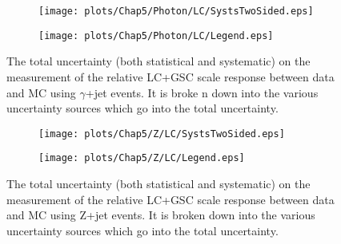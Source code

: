 \begin{figure}[!ht]
\captionsetup[subfigure]{labelformat=empty}
 \begin{center}
   \begin{subfigure}{0.55\textwidth}
     \hspace{-3cm}
     \texttt{[image: plots/Chap5/Photon/LC/SystsTwoSided.eps]}
   \end{subfigure}
   \begin{subfigure}{0.55\textwidth}     \vspace{-0.2cm}
     \texttt{[image: plots/Chap5/Photon/LC/Legend.eps]}
   \end{subfigure}
 \end{center}
 \caption[Uncertainty on the LC+GSC scale response measurement using $\gamma$+jet]
 {\small The total uncertainty (both statistical and systematic) on the measurement of the relative LC+GSC scale response between data and MC using $\gamma$+jet events.  It is broke
n down into the various uncertainty sources which go into the total uncertainty.  }
 \label{Fig:gJetSystsLC2016}
\end{figure}

\begin{figure}[!ht]
\captionsetup[subfigure]{labelformat=empty}
 \begin{center}
   \begin{subfigure}{0.55\textwidth}
     \hspace{-3cm}
     \texttt{[image: plots/Chap5/Z/LC/SystsTwoSided.eps]}
   \end{subfigure}
   \begin{subfigure}{0.55\textwidth}
     \vspace{-0.2cm}
     \texttt{[image: plots/Chap5/Z/LC/Legend.eps]}
   \end{subfigure}
 \end{center}
 \caption[Uncertainty on the LC+GSC scale response measurement using Z+jet]
 {\small The total uncertainty (both statistical and systematic) on the measurement of the relative LC+GSC scale response between data and MC using Z+jet events.  It is broken down into the various uncertainty sources which go into the total uncertainty.  }
 \label{Fig:ZJetSystsLC2016}
\end{figure}



